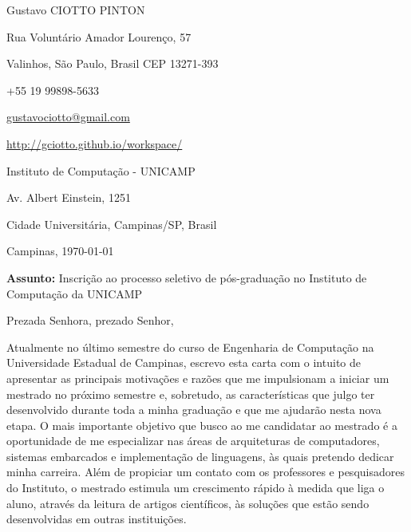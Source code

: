 \documentclass[12pt, a4paper]{article}
\begin{document}
\pagestyle{empty} 

Gustavo CIOTTO PINTON

Rua Voluntário Amador Lourenço, 57

Valinhos, São Paulo, Brasil CEP 13271-393

+55 19 99898-5633

\url{gustavociotto@gmail.com}

\url{http://gciotto.github.io/workspace/}
\begin{flushright}


Instituto de Computação - UNICAMP

Av. Albert Einstein, 1251

Cidade Universitária, Campinas/SP, Brasil



\end{flushright}



Campinas,  \today

\vspace{12pt}

\textbf{Assunto:} Inscrição ao processo seletivo de pós-graduação
no Instituto de Computação da UNICAMP

\vspace{12pt} 

Prezada Senhora, prezado Senhor, 

\vspace{12pt}

Atualmente no último semestre do curso de Engenharia de Computação na
Universidade Estadual de Campinas, escrevo esta carta com o intuito de
apresentar as principais motivações e razões que me impulsionam a iniciar um
mestrado no próximo semestre e, sobretudo, as características que julgo ter
desenvolvido durante toda a minha graduação e que me ajudarão nesta nova etapa. 
O mais importante objetivo que busco ao me candidatar ao mestrado é a
oportunidade de me especializar nas áreas de arquiteturas de computadores, 
sistemas embarcados e implementação de linguagens, às quais pretendo dedicar
minha carreira.  Além de propiciar um contato com os professores e
pesquisadores do Instituto, o mestrado estimula um crescimento rápido à medida
que liga o aluno,  através da leitura de artigos científicos, às soluções que
estão sendo desenvolvidas em outras instituições.
\end{document}
